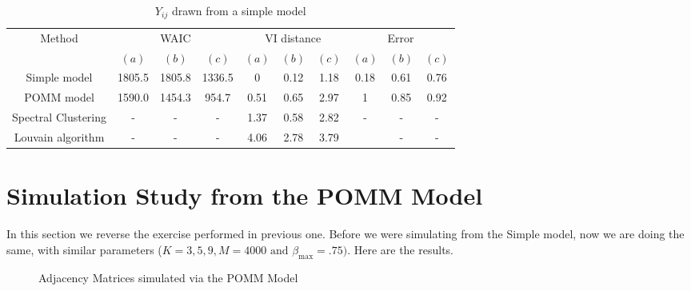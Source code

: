\documentclass[11pt]{amsart}
\begin{document}
\begin{table}[htbp]
\centering
\caption{$Y_{ij}$ drawn from a simple model}
\begin{tabular}{cccccccccc}
\toprule
\multirow{2}{*}{Method} & \multicolumn{3}{c}{WAIC} & \multicolumn{3}{c}{VI distance} & \multicolumn{3}{c}{Error} \\
\cmidrule(lr){2-4} \cmidrule(lr){5-7} \cmidrule(lr){8-10}
& $(a)$ & $(b)$ & $(c)$ & $(a)$ & $(b)$ & $(c)$ & $(a)$ & $(b)$ & $(c)$ \\
\midrule
Simple model & 1805.5 & 1805.8 & 1336.5 & 0 & 0.12 & 1.18 & 0.18 & 0.61 & 0.76 \\
POMM model & 1590.0 & 1454.3 & 954.7 & 0.51 & 0.65 & 2.97 & 1 & 0.85 & 0.92 \\
Spectral Clustering & - & - & - & 1.37 & 0.58 & 2.82 & - & - & - \\
Louvain algorithm & - & - & - & 4.06 & 2.78 & 3.79 &  & - & - \\
\bottomrule
\end{tabular}
\label{table:simulations_from_simple}
\end{table}



\clearpage

\section{Simulation Study from the POMM Model}

In this section we reverse the exercise performed in previous one. Before we were simulating from the Simple model, now we are doing the same, with similar parameters ($K=3,5,9, M=4000 \text{ and } \beta_{\max} = .75)$. Here are the results.

\begin{figure}[htbp]
    \centering
    \hfill
    \hfill
    \caption{Adjacency Matrices simulated via the POMM Model}
    \label{fig:all_images}
\end{figure}
\end{document}
